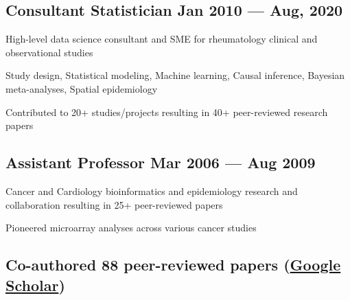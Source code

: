 \subsection{{Consultant Statistician \hfill Jan 2010 --- Aug, 2020}}
\begin{zitemize}
    \item High-level data science consultant and SME for rheumatology clinical and observational studies
    \item Study design, Statistical modeling, Machine learning, Causal inference, Bayesian meta-analyses, Spatial epidemiology
    \item Contributed to 20+ studies/projects resulting in 40+ peer-reviewed research papers
  
\end{zitemize}

\subsection{{Assistant Professor \hfill Mar 2006 --- Aug 2009}}
\begin{zitemize}
    \item Cancer and Cardiology bioinformatics and epidemiology research and collaboration resulting in 25+ peer-reviewed papers
    \item Pioneered microarray analyses across various cancer studies
\end{zitemize}

\subsection{Co-authored 88 peer-reviewed papers (\href{https://scholar.google.com/citations?hl=en&user=EgaGUCwAAAAJ}{Google Scholar})}

